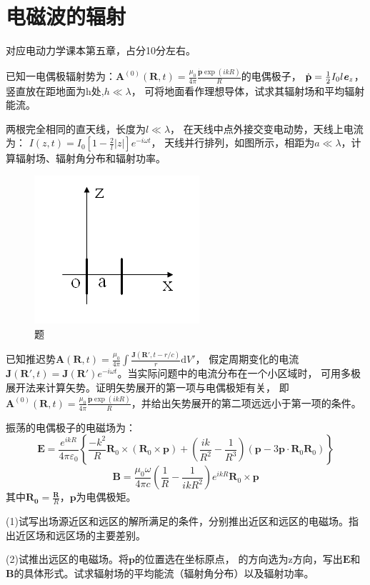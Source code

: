 \section{电磁波的辐射}
对应电动力学课本第五章，占分10分左右。

\begin{question}
    已知一电偶极辐射势为：$\mathbf{A}^{(0)}(\mathbf{R},t)=\frac{\mu_0}{4\pi}\frac{\dot{\mathbf{p}}\exp (ikR)}{R}$的电偶极子，
    $\dot{\mathbf{p}}=\frac{1}{2} I_0 l \textbf{\textit{e}}_z$，竖直放在距地面为h处,$h \ll \lambda$，
     可将地面看作理想导体，试求其辐射场和平均辐射能流。
\end{question}

\begin{question}
    两根完全相同的直天线，长度为$l\ll \lambda$，
    在天线中点外接交变电动势，天线上电流为： $I(z,t)=I_0[1-\frac{2}{l}\left| z \right|]\textit{e}^{-i\omega t}$，
    天线并行排列，如图所示，相距为$a\ll \lambda$，计算辐射场、辐射角分布和辐射功率。
    \begin{figure}[ht]
        \centering
        \includegraphics[height=3 cm]{images/q4_1.png}
        \caption{题\thequestion}
    \end{figure}
\end{question}

\begin{question}
    已知推迟势$\mathbf{A}(\mathbf{R},t)=\frac{\mu_0}{4\pi}\int \frac{\mathbf{J}(\mathbf{R}',t-r/c)}{r} \mathrm{d}V'$，
    假定周期变化的电流$\mathbf{J}(\mathbf{R}',t)=\mathbf{J}(\mathbf{R}')\textit{e}^{-i\omega t}$。当实际问题中的电流分布在一个小区域时，
    可用多极展开法来计算矢势。证明矢势展开的第一项与电偶极矩有关，
    即$\mathbf{A}^{(0)}(\mathbf{R},t)=\frac{\mu_0}{4\pi}\frac{\dot{\mathbf{p}}\exp (ikR)}{R}$，并给出矢势展开的第二项远远小于第一项的条件。
\end{question}

\begin{question}
    振荡的电偶极子的电磁场为：
    $$\mathbf{E}=\frac{\textit{e}^{ikR}}{4\pi\varepsilon_0 }\left \{ \frac{-k^2}{R}\mathbf{R}_0\times(\mathbf{R}_0\times \mathbf{p})+(\frac{ik}{R^2}-\frac{1}{R^3})(\mathbf{p}-3\mathbf{p}\cdot\mathbf{R}_0\mathbf{R}_0) \right \}$$
    $$\mathbf{B}=\frac{\mu_0 \omega }{4\pi c}(\frac{1}{R}-\frac{1}{ikR^2})\textit{e}^{ikR}\mathbf{R}_0\times \mathbf{p}$$
     其中$\mathbf{R_0}=\frac{\mathbf{R}}{R}$，$\mathbf{p}$为电偶极矩。
    
     \noindent (1)试写出场源近区和远区的解所满足的条件，分别推出近区和远区的电磁场。指出近区场和远区场的主要差别。
    
     \noindent (2)试推出远区的电磁场。将$\mathbf{p}$的位置选在坐标原点， 的方向选为z方向，写出$\mathbf{E}$和$\mathbf{B}$的具体形式。试求辐射场的平均能流（辐射角分布）以及辐射功率。
\end{question}

